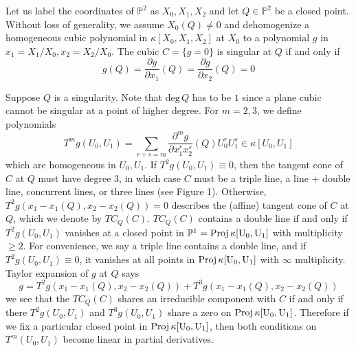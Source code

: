 \documentclass[12pt]{article}
\theoremstyle{plain}
\theoremstyle{definition}
\newcommand{\IA}{\mathbb{A}}
\newcommand{\IP}{\mathbb{P}}
\newcommand{\sT}{\mathcal{T}}
\renewcommand{\deg}{\mathrm{deg}\,}
\newcommand{\Proj}{\rm Proj\,}
\newcommand{\<}{\langle}
\renewcommand{\>}{\rangle}
\newcommand{\p}{\partial}
\begin{document}
Let us label the coordinates of $\IP^2$ as $X_0, X_1, X_2$ and let $Q \in \IP^2$ be a closed point. Without loss of generality, we assume $X_0(Q) \neq 0$ and dehomogenize a homogeneous cubic polynomial in $\kappa[X_0, X_1, X_2]$ at $X_0$ to a polynomial $g$ in $x_1 = X_1/X_0, x_2 = X_2/X_0$. The cubic $C = \{g = 0\}$ is singular at $Q$ if and only if 
$$ g(Q) = \frac{\p g}{\p x_1} (Q) = \frac{\p g}{\p x_2}(Q) = 0$$

Suppose $Q$ is a singularity. Note that $\deg Q$ has to be $1$ since a plane cubic cannot be singular at a point of higher degree. %
For $m = 2, 3$, we define polynomials 
$$ T^m g(U_0, U_1) = \sum_{r + s = m} \frac{\p^m g}{\p x_1^r x_2^s}(Q) U_0^r U_1^s \in \kappa[U_0, U_1]$$
which are homogeneous in $U_0, U_1$. If $T^2 g(U_0, U_1) \equiv 0$, then the tangent cone of $C$ at $Q$ must have degree $3$, in which case $C$ must be a triple line, a line + double line, concurrent lines, or three lines (see Figure 1). Otherwise, $T^2 g(x_1 - x_1(Q), x_2 - x_2(Q)) = 0$ describes the (affine) tangent cone of $C$ at $Q$, which we denote by $TC_Q(C)$. $TC_Q(C)$ contains a double line if and only if $T^2 g(U_0, U_1)$ vanishes at a closed point in $\IP^1 = \Proj \kappa[U_0, U_1]$ with multiplicity $\ge 2$. For convenience, we say a triple line contains a double line, and if $T^2 g(U_0, U_1) \equiv 0$, it vanishes at all points in $\Proj \kappa[U_0, U_1]$ with $\infty$ multiplicity. Taylor expansion of $g$ at $Q$ says
$$ g = T^2 g(x_1 - x_1(Q), x_2 - x_2(Q)) + T^3 g(x_1 - x_1(Q), x_2 - x_2(Q)) $$
we see that the $TC_Q(C)$ shares an irreducible component with $C$ if and only if there $T^2 g(U_0, U_1)$ and $T^3 g(U_0, U_1)$ share a zero on $\Proj \kappa[U_0, U_1]$. Therefore if we fix a particular closed point in $\Proj \kappa[U_0, U_1]$, then both conditions on $T^m(U_0, U_1)$ become linear in partial derivatives.
\end{document}
